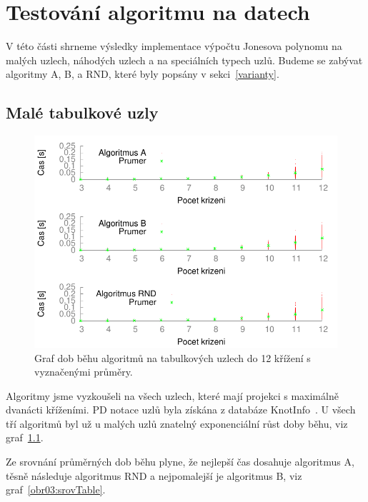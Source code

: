 
\chapter{Testování algoritmu na datech}

V této části shrneme výsledky implementace výpočtu Jonesova polynomu na malých uzlech, náhodých uzlech a na speciálních typech uzlů.
Budeme se zabývat algoritmy A, B, a RND, které byly popsány v sekci~\ref{varianty}.

\section{Malé tabulkové uzly}

\begin{figure}[p]\centering
\includegraphics{../img/multiTable}
\caption{Graf dob běhu algoritmů na tabulkových uzlech do 12 křížení s vyznačenými průměry.}
\label{obr03:multiTable}
\end{figure}

Algoritmy jsme vyzkoušeli na všech uzlech, které mají projekci s maximálně dvanácti kříženími. PD notace uzlů byla získána z databáze KnotInfo~\cite{knotinfo}.
U všech tří algoritmů byl už u malých uzlů znatelný exponenciální růst doby běhu, viz graf~\ref{obr03:multiTable}. 

Ze srovnání průměrných dob běhu plyne, že nejlepší čas dosahuje algoritmus A, těsně následuje algoritmus RND a nejpomalejší je algoritmus B, viz graf~\ref{obr03:srovTable}. 
	
